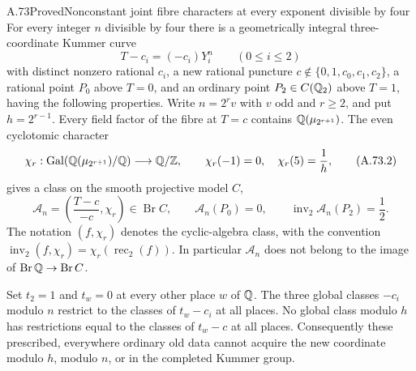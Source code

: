 \begin{statement}{A.73}{Proved}{Nonconstant joint fibre characters at every exponent divisible by four}
For every integer $n$ divisible by four there is a geometrically
integral three-coordinate Kummer curve
\[
       T-c_i=(-c_i)Y_i^n\qquad(0\le i\le2)
       \tag{A.73.1}
\]
with distinct nonzero rational $c_i$, a new rational puncture
$c\notin\{0,1,c_0,c_1,c_2\}$, a rational point $P_0$ above
$T=0$, and an ordinary point $P_2\in C(\mathbb Q_2)$ above $T=1$,
having the following properties.  Write $n=2^rv$ with $v$ odd
and $r\ge2$, and put $h=2^{r-1}$.
Every field factor of the fibre at $T=c$ contains
$\mathbb Q(\mu_{2^{r+1}})$.  The even cyclotomic character
\[
 \chi_r:\operatorname{Gal}(\mathbb Q(\mu_{2^{r+1}})/\mathbb Q)
                  \longrightarrow\mathbb Q/\mathbb Z,
 \qquad \chi_r(-1)=0,\quad\chi_r(5)=\frac1h,
       \tag{A.73.2}
\]
gives a class on the smooth projective model $C$,
\[
       \mathcal A_n=
            \left(\frac{T-c}{-c},\chi_r\right)\in\operatorname{Br}C,
 \qquad \mathcal A_n(P_0)=0,
 \qquad \operatorname{inv}_2\mathcal A_n(P_2)=\frac12.
       \tag{A.73.3}
\]
The notation $(f,\chi_r)$ denotes the cyclic-algebra class, with
the convention $\operatorname{inv}_2(f,\chi_r)
=\chi_r(\operatorname{rec}_2(f))$.
In particular $\mathcal A_n$ does not belong to the image of
$\operatorname{Br}\mathbb Q\to\operatorname{Br}C$.

Set $t_2=1$ and $t_w=0$ at every other place $w$ of $\mathbb Q$.
The three global classes $-c_i$ modulo $n$ restrict to the classes
of $t_w-c_i$ at all places.  No global class modulo $h$ has
restrictions equal to the classes of $t_w-c$ at all places.
Consequently these prescribed, everywhere ordinary old data
cannot acquire the new coordinate modulo $h$, modulo $n$, or
in the completed Kummer group.
\end{statement}
